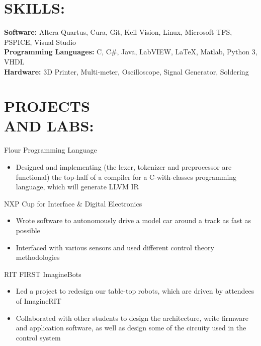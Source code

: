 \documentclass[line,margin]{res}
\begin{document}
\begin{resume}
	\section{SKILLS:}

		\textbf{Software:} Altera Quartus, Cura, Git, Keil \si{\micro}\hspace{-.5pt}Vision, Linux, Microsoft TFS, PSPICE, Visual Studio\\
		\textbf{Programming Languages:} C, C\#, Java, LabVIEW, \LaTeX, Matlab, Python 3, VHDL \\
		\textbf{Hardware:} 3D Printer, Multi-meter, Oscilloscope, Signal Generator, Soldering

	\section{PROJECTS \\AND LABS:}


		Flour Programming Language
		\begin{itemize} 
			\item Designed and implementing (the lexer, tokenizer and preprocessor are functional) the top-half of a compiler for a C-with-classes programming language, which will generate LLVM IR
		\end{itemize}
		\vspace{-10pt}

		NXP Cup for Interface \& Digital Electronics
		\begin{itemize}
			\item Wrote software to autonomously drive a model car around a track as fast as possible
			\item Interfaced with various sensors and used different control theory methodologies
		\end{itemize}
		\vspace{-10pt}

		RIT FIRST ImagineBots
		\begin{itemize}
			\item Led a project to redesign our table-top robots, which are driven by attendees of ImagineRIT 
			\item Collaborated with other students to design the architecture, write firmware and application software, as well as design some of the circuity used in the control system
		\end{itemize}


\end{resume}
\end{document}
